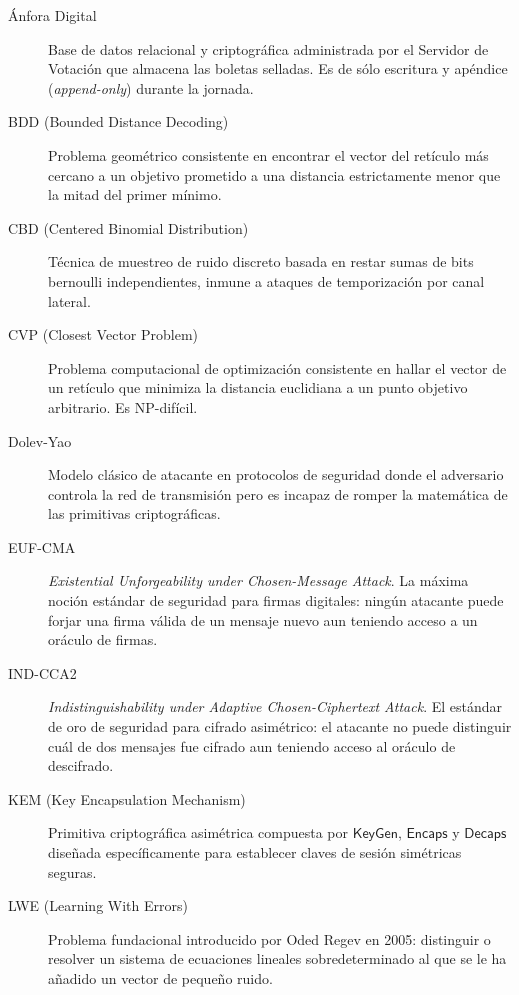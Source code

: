 \documentclass[11pt,a4paper,twoside,openright]{book}
\theoremstyle{plain}
\theoremstyle{definition}
\theoremstyle{remark}
\newcommand{\KeyGen}{\mathsf{KeyGen}}
\newcommand{\Encaps}{\mathsf{Encaps}}
\newcommand{\Decaps}{\mathsf{Decaps}}
\begin{document}
\begin{description}
  \item[\'Anfora Digital] Base de datos relacional y criptogr\'afica administrada por el Servidor de Votaci\'on que almacena las boletas selladas. Es de s\'olo escritura y ap\'endice (\emph{append-only}) durante la jornada.
  
  \item[BDD (Bounded Distance Decoding)] Problema geom\'etrico consistente en encontrar el vector del ret\'iculo m\'as cercano a un objetivo prometido a una distancia estrictamente menor que la mitad del primer m\'inimo.
  
  \item[CBD (Centered Binomial Distribution)] T\'ecnica de muestreo de ruido discreto basada en restar sumas de bits bernoulli independientes, inmune a ataques de temporizaci\'on por canal lateral.
  
  \item[CVP (Closest Vector Problem)] Problema computacional de optimizaci\'on consistente en hallar el vector de un ret\'iculo que minimiza la distancia euclidiana a un punto objetivo arbitrario. Es NP-dif\'icil.
  
  \item[Dolev-Yao] Modelo cl\'asico de atacante en protocolos de seguridad donde el adversario controla la red de transmisi\'on pero es incapaz de romper la matem\'atica de las primitivas criptogr\'aficas.
  
  \item[EUF-CMA] \emph{Existential Unforgeability under Chosen-Message Attack}. La m\'axima noci\'on est\'andar de seguridad para firmas digitales: ning\'un atacante puede forjar una firma v\'alida de un mensaje nuevo aun teniendo acceso a un or\'aculo de firmas.
  
  \item[IND-CCA2] \emph{Indistinguishability under Adaptive Chosen-Ciphertext Attack}. El est\'andar de oro de seguridad para cifrado asim\'etrico: el atacante no puede distinguir cu\'al de dos mensajes fue cifrado aun teniendo acceso al or\'aculo de descifrado.
  
  \item[KEM (Key Encapsulation Mechanism)] Primitiva criptogr\'afica asim\'etrica compuesta por $\KeyGen$, $\Encaps$ y $\Decaps$ dise\~nada espec\'ificamente para establecer claves de sesi\'on sim\'etricas seguras.
  
  \item[LWE (Learning With Errors)] Problema fundacional introducido por Oded Regev en 2005: distinguir o resolver un sistema de ecuaciones lineales sobredeterminado al que se le ha a\~nadido un vector de peque\~no ruido.
  

\end{description}
\end{document}
